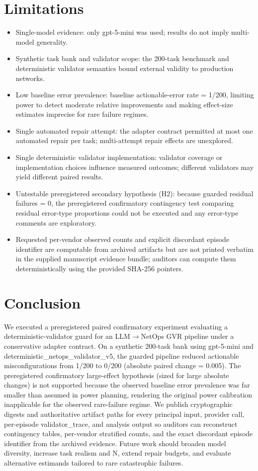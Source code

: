 \documentclass[conference]{IEEEtran}
\begin{document}
\section{Limitations}
\begin{itemize}
\item Single-model evidence: only gpt-5-mini was used; results do not imply multi-model generality.
\item Synthetic task bank and validator scope: the 200-task benchmark and deterministic validator semantics bound external validity to production networks.
\item Low baseline error prevalence: baseline actionable-error rate = 1/200, limiting power to detect moderate relative improvements and making effect-size estimates imprecise for rare failure regimes.
\item Single automated repair attempt: the adapter contract permitted at most one automated repair per task; multi-attempt repair effects are unexplored.
\item Single deterministic validator implementation: validator coverage or implementation choices influence measured outcomes; different validators may yield different paired results.
\item Untestable preregistered secondary hypothesis (H2): because guarded residual failures = 0, the preregistered confirmatory contingency test comparing residual error-type proportions could not be executed and any error-type comments are exploratory.
\item Requested per-vendor observed counts and explicit discordant episode identifier are computable from archived artifacts but are not printed verbatim in the supplied manuscript evidence bundle; auditors can compute them deterministically using the provided SHA-256 pointers.
\end{itemize}

\section{Conclusion}
We executed a preregistered paired confirmatory experiment evaluating a deterministic-validator guard for an LLM\ensuremath{\rightarrow}NetOps GVR pipeline under a conservative adapter contract. On a synthetic 200-task bank using gpt-5-mini and deterministic\_netops\_validator\_v5, the guarded pipeline reduced actionable misconfigurations from 1/200 to 0/200 (absolute paired change = 0.005). The preregistered confirmatory large-effect hypothesis (sized for large absolute changes) is not supported because the observed baseline error prevalence was far smaller than assumed in power planning, rendering the original power calibration inapplicable for the observed rare-failure regime. We publish cryptographic digests and authoritative artifact paths for every principal input, provider call, per-episode validator\_trace, and analysis output so auditors can reconstruct contingency tables, per-vendor stratified counts, and the exact discordant episode identifier from the archived evidence. Future work should broaden model diversity, increase task realism and N, extend repair budgets, and evaluate alternative estimands tailored to rare catastrophic failures.
\end{document}
